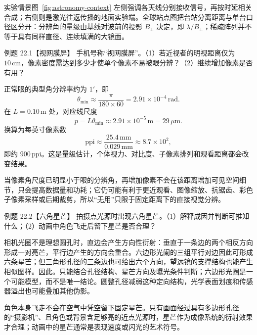 \label{fig:astronomy-context}
\ArrayDiagram

实验情景图~\ref{fig:astronomy-context} 左侧强调各天线分别接收信号，再按时延相关合成；右侧则是激光往返传播的地面实验端。全球站点图把台站分离距离与单台口径区分开：分辨角的量级由基线对波前的投影 $B_\perp$ 决定，即 $\lambda/B_\perp$；稀疏阵列并不等于具有同样直径、连续填满的大镜面。

\begin{origexamplebox}{例题 22.1【视网膜屏】}
手机号称“视网膜屏”。（1）若近视者的明视距离仅为 $10\,\mathrm{cm}$，像素密度需达到多少才使单个像素不易被眼分辨？（2）继续增加像素是否有用？
\end{origexamplebox}
\begin{xesolution}
正常眼的典型角分辨率约为 $1'$，即
\[
 \theta_{\min}\approx\frac{\pi}{180\times60}=2.91\times10^{-4}\,\mathrm{rad}.
\]
在 $L=0.10\,\mathrm m$ 处，对应线尺度
\[
 p=L\theta_{\min}\approx2.91\times10^{-5}\,\mathrm m=29\,\mu\mathrm m.
\]
换算为每英寸像素数
\[
 \boxed{\mathrm{ppi}\approx\frac{25.4\,\mathrm{mm}}{0.029\,\mathrm{mm}}\approx8.7\times10^2},
\]
即约 $900\,\mathrm{ppi}$。这是量级估计，个体视力、对比度、子像素排列和观看距离都会改变结果。

当像素角尺度已明显小于眼的分辨角，再增加像素不会在该距离增加可见空间细节，只会提高数据量和功耗；它仍可能有利于更近观看、图像缩放、抗锯齿、彩色子像素采样或后期裁剪，所以“无用”只限于固定距离下的直接视觉分辨。
\end{xesolution}

\begin{origexamplebox}{例题 22.2【六角星芒】}
拍摄点光源时出现六角星芒。（1）解释成因并判断可推知什么；（2）动画中角色飞走后留下星芒是否合理？
\end{origexamplebox}
\begin{xesolution}
相机光圈不是理想圆孔时，直边会产生方向性衍射：垂直于一条边的两个相反方向形成一对亮芒，平行边产生的方向会重合。六边形光阑的三组平行对边因此可形成六条星芒；但三角形孔径的三条边也可给出六个方向，望远镜的支撑结构也能产生相似图样。因此。只能结合孔径结构、星芒方向及曝光条件判断；六边形光圈是一个可能模型，而不是唯一结论。圆整孔径减弱这种定向结构，光学表面划痕和传感器溢出也可能叠加其他伪影。

角色本身飞走不会在空气中凭空留下固定星芒。只有画面经过具有多边形孔径的“摄影机”、且角色或背景含足够亮的近点光源时，星芒作为成像系统的衍射效果才合理；动画中的星芒通常是表现速度或闪光的艺术符号。
\end{xesolution}

